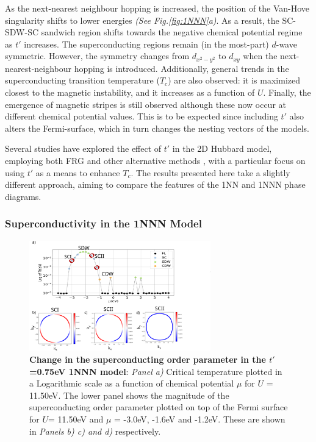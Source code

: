 \documentclass[11pt]{article}
\begin{document}
\noindent
As the next-nearest neighbour hopping is increased, the position of the Van-Hove singularity shifts to lower energies \textit{(See Fig.\ref{fig:1NNN}a)}. 
As a result, the SC-SDW-SC sandwich 
region shifts towards the negative chemical potential regime as $t'$ increases.
The superconducting regions remain (in the most-part) $d$-wave symmetric. However, the symmetry changes from $d_{x^2-y^2}$ to $d_{xy}$ when the 
next-nearest-neighbour hopping is introduced. Additionally, general trends in the superconducting transition
temperature ($T_c$) are also observed: it is maximized closest to the 
magnetic instability, and it increases as a function of $U$. Finally, the emergence of magnetic stripes is still observed although
these now occur at different chemical potential values. This is to be expected since including  $t'$ also alters the Fermi-surface, which in turn changes the nesting vectors of the models.\par
\medskip
\noindent Several studies have explored the effect of $t'$ in the 2D Hubbard model, 
employing both FRG \cite{husemann2012incommensurate} and other alternative methods \cite{fontenele2025effects}, 
with a particular focus on using $t'$ as a means to enhance $T_c$. The results presented here take a slightly different approach, aiming to 
compare the features of the 1NN and 1NNN phase diagrams.



\subsubsection{Superconductivity in the 1NNN Model}
\label{subsubsec:SC1NNN}

\begin{figure}[htbp]  %
    \centering
    \includegraphics[width=0.70\textwidth]{1NNNSC_075.png}  %
    \caption{\textbf{Change in the superconducting order parameter in the $t'$ =0.75eV 1NNN model}: \textit{Panel a)} Critical temperature plotted in a Logarithmic scale
    as a function of chemical potential $\mu$ for $U$ = 11.50eV.
    The lower panel shows the magnitude of the superconducting order parameter plotted on top of the Fermi surface for $U$= 11.50eV and $\mu$ = -3.0eV, -1.6eV and -1.2eV. These are shown in \textit{Panels b)
    c) and d)} respectively.  }
    \label{fig:1NNNSC}
\end{figure}
\end{document}
